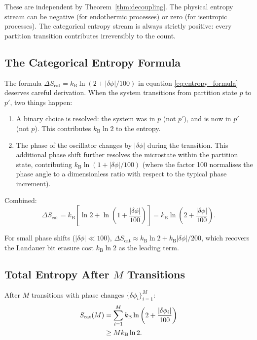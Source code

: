 \documentclass[twocolumn,10pt]{article}
\newcommand{\kB}{k_{\mathrm{B}}}
\newcommand{\Scat}{S_{\mathrm{cat}}}
\begin{document}
These are independent by Theorem~\ref{thm:decoupling}. The physical entropy stream can be negative (for endothermic processes) or zero (for isentropic processes). The categorical entropy stream is always strictly positive: every partition transition contributes irreversibly to the count.

\subsection{The Categorical Entropy Formula}

The formula $\Delta\Scat = \kB\ln(2 + |\delta\phi|/100)$ in equation \eqref{eq:entropy_formula} deserves careful derivation. When the system transitions from partition state $p$ to $p'$, two things happen:

\begin{enumerate}
    \item A binary choice is resolved: the system was in $p$ (not $p'$), and is now in $p'$ (not $p$). This contributes $\kB\ln 2$ to the entropy.

    \item The phase of the oscillator changes by $|\delta\phi|$ during the transition. This additional phase shift further resolves the microstate within the partition state, contributing $\kB\ln(1 + |\delta\phi|/100)$ (where the factor 100 normalises the phase angle to a dimensionless ratio with respect to the typical phase increment).
\end{enumerate}

Combined:
\begin{equation}
    \Delta\Scat = \kB\left[\ln 2 + \ln\left(1 + \frac{|\delta\phi|}{100}\right)\right] = \kB\ln\left(2 + \frac{|\delta\phi|}{100}\right).
\end{equation}

For small phase shifts ($|\delta\phi| \ll 100$), $\Delta\Scat \approx \kB\ln 2 + \kB|\delta\phi|/200$, which recovers the Landauer bit erasure cost $\kB\ln 2$ as the leading term.

\subsection{Total Entropy After $M$ Transitions}

After $M$ transitions with phase changes $\{\delta\phi_i\}_{i=1}^M$:
\begin{align}
    \Scat(M) &= \sum_{i=1}^M \kB\ln\left(2 + \frac{|\delta\phi_i|}{100}\right) \notag\\
    &\geq M \kB \ln 2.
\end{align}
\end{document}
